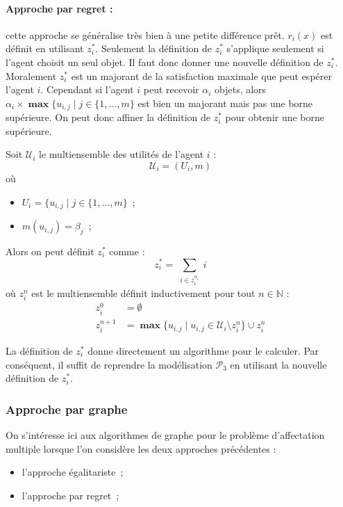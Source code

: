 \documentclass[a4paper, titlepage, oneside, 12pt]{article}%
\newcommand\boldmax{\mathop{\mathbf{max}}}
\begin{document}
\paragraph{Approche par regret : } cette approche se généralise très bien à une petite différence prêt. $r_i(x)$ est définit en utilisant $z_i^*$. Seulement la définition de $z_i^*$ s'applique seulement si l'agent choisit un seul objet. Il faut donc donner une nouvelle définition de $z_i^*$. Moralement $z_i^*$ est un majorant de la satisfaction maximale que peut espérer l'agent $i$. Cependant si l'agent $i$ peut recevoir $\alpha_i$ objets, alors $\alpha_i \times \boldmax \{u_{i,j} \mid j\in \{1,..., m\}$ est bien un majorant mais pas une borne supérieure. On peut donc affiner la définition de $z_i^*$ pour obtenir une borne supérieure. 

Soit $\mathcal{U}_i$ le multiensemble des utilités de l'agent $i$ : 
$$\mathcal{U}_i=(U_i,m)$$ où 
\begin{itemize}
\item $U_i=\{u_{i,j} \mid j \in \{1,\dots,m\}$~;
\item $m(u_{i,j})=\beta_j$~;
\end{itemize}

Alors on peut définit $z_i^*$ comme :
$$z_i^*=\sum_{\substack{i \in z_i^{\alpha_i}}} i$$ 
où $z_i^{n}$ est le multiensemble définit inductivement pour tout $n\in \mathbb{N}$ : 
\begin{align*}
z_i^0 &= \emptyset \\
z_i^{n+1} &= \boldmax \{u_{i,j} \mid u_{i,j} \in \mathcal{U}_i \setminus z_i^{n} \} \cup z_i^{n} 
\end{align*} 

La définition de $z_i^*$ donne directement un algorithme pour le calculer. Par conséquent, il suffit de reprendre la modélisation $\mathcal{P}_3$ en utilisant la nouvelle définition de $z_i^*$.

\subsubsection{Approche par graphe}

On s'intéresse ici aux algorithmes de graphe pour le problème d'affectation multiple lorsque l'on considère les deux approches précédentes :
\begin{itemize}
\item l'approche égalitariste~;
\item l'approche par regret~;
\end{itemize}
\end{document}
